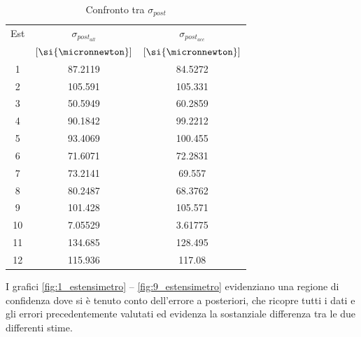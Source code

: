 \documentclass[a4paper,11pt,oneside]{article}
\begin{document}
\begin{table}
\centering
\caption{Confronto tra $\sigma_{post}$}
\label{tab:confronto_sigma_posteriori}
    \begin{tabular}{|c|c|c|}
    \hline
    Est & $\sigma_{post_{all}}$ & $\sigma_{post_{acc}}$ \\
        & $[\si{\micronnewton}]$ & $[\si{\micronnewton}]$  \\\hline
    {\cellcolor[rgb]{0.85,0.85,0.85}}1   & {\cellcolor[rgb]{0.85,0.85,0.85}}87.2119       & {\cellcolor[rgb]{0.85,0.85,0.85}}84.5272        \\\hline
    2   & 105.591       & 105.331        \\\hline
    {\cellcolor[rgb]{0.85,0.85,0.85}}3   & {\cellcolor[rgb]{0.85,0.85,0.85}}50.5949       & {\cellcolor[rgb]{0.85,0.85,0.85}}60.2859        \\\hline
    4   & 90.1842       & 99.2212        \\\hline
    {\cellcolor[rgb]{0.85,0.85,0.85}}5   & {\cellcolor[rgb]{0.85,0.85,0.85}}93.4069       & {\cellcolor[rgb]{0.85,0.85,0.85}}100.455        \\\hline
    6   & 71.6071       & 72.2831        \\\hline
    {\cellcolor[rgb]{0.85,0.85,0.85}}7   & {\cellcolor[rgb]{0.85,0.85,0.85}}73.2141       & {\cellcolor[rgb]{0.85,0.85,0.85}}69.557         \\\hline
    8   & 80.2487       & 68.3762        \\\hline
    {\cellcolor[rgb]{0.85,0.85,0.85}}9   & {\cellcolor[rgb]{0.85,0.85,0.85}}101.428       & {\cellcolor[rgb]{0.85,0.85,0.85}}105.571        \\\hline
    10  & 7.05529       & 3.61775        \\\hline\hline
    {\cellcolor[rgb]{0.85,0.85,0.85}}11   & {\cellcolor[rgb]{0.85,0.85,0.85}}134.685      & {\cellcolor[rgb]{0.85,0.85,0.85}}128.495       \\\hline
    12  & 115.936      & 117.08       \\\hline

    \end{tabular}
\end{table}

I grafici \ref{fig:1_estensimetro} -- \ref{fig:9_estensimetro} evidenziano una regione di confidenza dove si è tenuto conto dell'errore a posteriori, che ricopre tutti i dati e gli errori precedentemente valutati ed evidenza la sostanziale differenza tra le due differenti stime.
\end{document}
